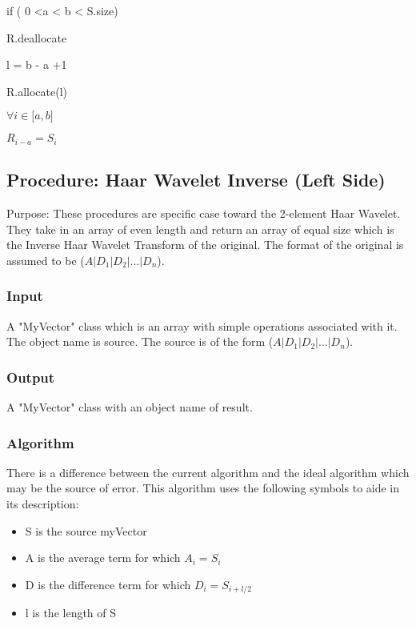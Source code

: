 \qquad if ( 0 <a < b < S.size)

\qquad \qquad R.deallocate

\qquad \qquad l = b - a +1

\qquad \qquad R.allocate(l)

\qquad \qquad $\forall i\in \lbrack a,b]$

\qquad \qquad \qquad $R_{i-a}=S_{i}$

\bigskip


\subsection {Procedure: Haar Wavelet Inverse (Left Side)}
Purpose:  These procedures are specific case toward the 2-element Haar Wavelet.  They take in an array of even length and return an array of equal size which is the Inverse Haar Wavelet Transform of the original.  The format of the original is assumed to be ($A|D_{1}|D_{2}|...|D_{n}$).

\subsubsection {Input}
A "MyVector" class which is an array with simple operations associated with it.   The object name is source.  The source is of the form ($A|D_{1}|D_{2}|...|D_{n}$).  

\subsubsection{Output} 
A "MyVector"  class with an object name of result.  

\subsubsection{Algorithm}
There is a difference between the current algorithm and the ideal algorithm which may be the source of error.  This algorithm uses the following symbols to aide in its description:
\begin{itemize}
\item S is the source myVector
\item A is the average term for which $A_i = S_i$ \newline
\item D is the difference term for which $D_i = S_{i+l/2}$ \newline
\item l is the length of S
\end{itemize}

